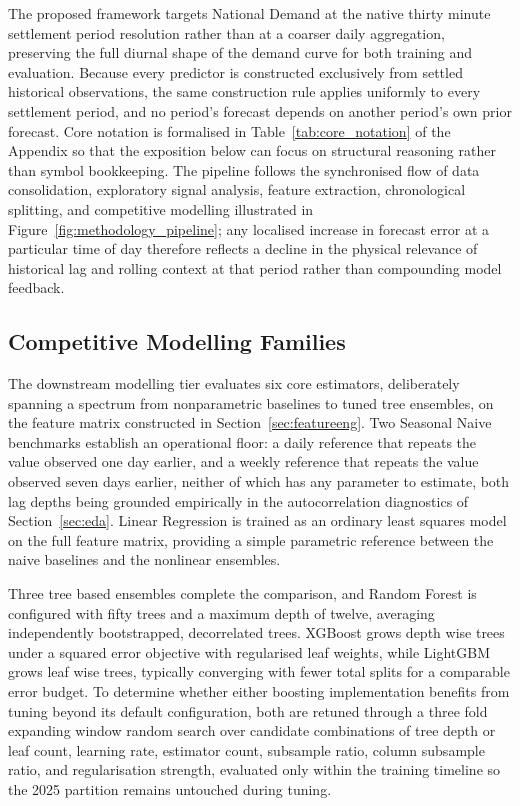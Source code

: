 \documentclass[runningheads]{llncs}
\begin{document}
The proposed framework targets National Demand at the native thirty minute settlement period resolution rather than at a coarser daily aggregation, preserving the full diurnal shape of the demand curve for both training and evaluation. Because every predictor is constructed exclusively from settled historical observations, the same construction rule applies uniformly to every settlement period, and no period's forecast depends on another period's own prior forecast. Core notation is formalised in Table~\ref{tab:core_notation} of the Appendix so that the exposition below can focus on structural reasoning rather than symbol bookkeeping. The pipeline follows the synchronised flow of data consolidation, exploratory signal analysis, feature extraction, chronological splitting, and competitive modelling illustrated in Figure~\ref{fig:methodology_pipeline}; any localised increase in forecast error at a particular time of day therefore reflects a decline in the physical relevance of historical lag and rolling context at that period rather than compounding model feedback.



\subsection{Competitive Modelling Families}
\label{sec:models}

The downstream modelling tier evaluates six core estimators, deliberately spanning a spectrum from nonparametric baselines to tuned tree ensembles, on the feature matrix constructed in Section~\ref{sec:featureeng}. Two Seasonal Naive benchmarks establish an operational floor: a daily reference that repeats the value observed one day earlier, and a weekly reference that repeats the value observed seven days earlier, neither of which has any parameter to estimate, both lag depths being grounded empirically in the autocorrelation diagnostics of Section~\ref{sec:eda}. Linear Regression is trained as an ordinary least squares model on the full feature matrix, providing a simple parametric reference between the naive baselines and the nonlinear ensembles.

Three tree based ensembles complete the comparison, and Random Forest \cite{breiman2001random} is configured with fifty trees and a maximum depth of twelve, averaging independently bootstrapped, decorrelated trees. XGBoost \cite{chen2016xgboost} grows depth wise trees under a squared error objective with regularised leaf weights, while LightGBM \cite{ke2017lightgbm} grows leaf wise trees, typically converging with fewer total splits for a comparable error budget. To determine whether either boosting implementation benefits from tuning beyond its default configuration, both are retuned through a three fold expanding window random search over candidate combinations of tree depth or leaf count, learning rate, estimator count, subsample ratio, column subsample ratio, and regularisation strength, evaluated only within the training timeline so the 2025 partition remains untouched during tuning.
\end{document}
